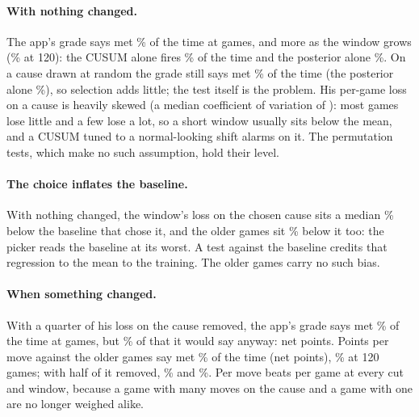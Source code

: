 \documentclass[11pt]{article}
\begin{document}
\begin{table}[h]
\centering
\TableForty

\medskip
\TableEighty

\medskip
\TableHundred
\caption{The share of simulated focuses graded met, by grade, window and the share of his loss
on the cause removed. With no change, every share above the level (\Level\%) is a false met.}
\end{table}

\paragraph{With nothing changed.} The app's grade says met \NullApp\% of the time at \Window{}
games, and more as the window grows (\NullAppLong\% at 120): the CUSUM alone fires
\NullCusum\% of the time and the posterior alone \NullPosterior\%. On a cause drawn at random the
grade still says met \NullControl\% of the time (the posterior alone \NullControlPosterior\%), so
selection adds little; the test itself is the problem. His per-game loss on a cause is heavily
skewed (a median coefficient of variation of \Cv): most games lose little and a few lose a lot,
so a short window usually sits below the mean, and a CUSUM tuned to a normal-looking shift
alarms on it. The permutation tests, which make no such assumption, hold their level.

\paragraph{The choice inflates the baseline.} With nothing changed, the window's loss on the
chosen cause sits a median \DriftWindow\% below the baseline that chose it, and the older games
sit \DriftOlder\% below it too: the picker reads the baseline at its worst. A test against the
baseline credits that regression to the mean to the training. The older games carry no such
bias.

\paragraph{When something changed.} With a quarter of his loss on the cause removed, the app's
grade says met \QuarterApp\% of the time at \Window{} games, but \NullApp\% of that it would say
anyway: net \QuarterAppNet{} points. Points per move against the older games say met
\QuarterPerMove\% of the time (net \QuarterPerMoveNet{} points), \QuarterPerMoveLong\% at 120
games; with half of it removed, \HalfPerMove\% and \HalfPerMoveLong\%. Per move beats per game at
every cut and window, because a game with many moves on the cause and a game with one are no
longer weighed alike.
\end{document}
